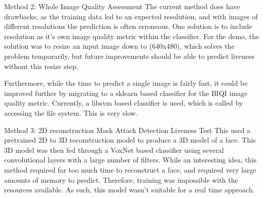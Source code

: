 \documentclass[final]{beamer}
\begin{document}
\begin{frame}{}
\begin{columns}[t]
\begin{column}{.48\linewidth}
\begin{block}{Method 2: Whole Image Quality Assessment}
          The current method does have drawbacks, as the training data led to an expected resolution, and with images of different resolutions
          the prediction is often erroneous. One solution is to include resolution as it's own image quality metric within the classifier. For the demo,
          the solution was to resize an input image down to (640x480), which solves the problem temporarily, but future improvements should be able to predict
          liveness without this resize step.

          Furthermore, while the time to predict a single image is fairly fast, it could be improved further by migrating to a sklearn based classifier for the BIQI image quality metric.
          Currently, a libsvm based classifier is used, which is called by accessing the file system. This is very slow.

        \end{block}
        \begin{block}{Method 3: 2D reconstruction Mask Attack Detection Liveness Test}
          This used a pretrained 2D to 3D reconstruction model to produce a 3D model of a face. This 3D model was then fed through a VoxNet based
          classifier using several convolutional layers with a large number of filters. While an interesting idea, this method required far too much time
          to reconstruct a face, and required very large amounts of memory to predict. Therefore, training was impossible with the resources available. As such, this model wasn't suitable for
          a real time approach. 
        \end{block}

          

\end{column}
\end{columns}
\end{frame}
\end{document}
